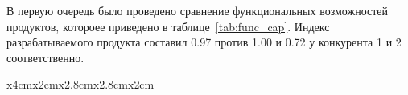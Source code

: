 В первую очередь было проведено сравнение функциональных возможностей продуктов, котороее приведено в таблице~\ref{tab:func_cap}. Индекс разрабатываемого продукта составил 0.97 против 1.00 и 0.72 у конкурента 1 и 2 соответственно.

\begin{longtable}{ x{4cm}x{2cm}x{2.8cm}x{2.8cm}x{2cm} } 
	
    \caption {Результаты бальной оценки ПО по функциональным возможностям}\label{tab:func_cap}\\ \toprule
\endfirsthead
\caption* {Продолжение таблицы \ref{tab:func_cap}}\\ \toprule
	
	\endhead
	
	\endfoot
	
	\endlastfoot
	

\end{longtable}
